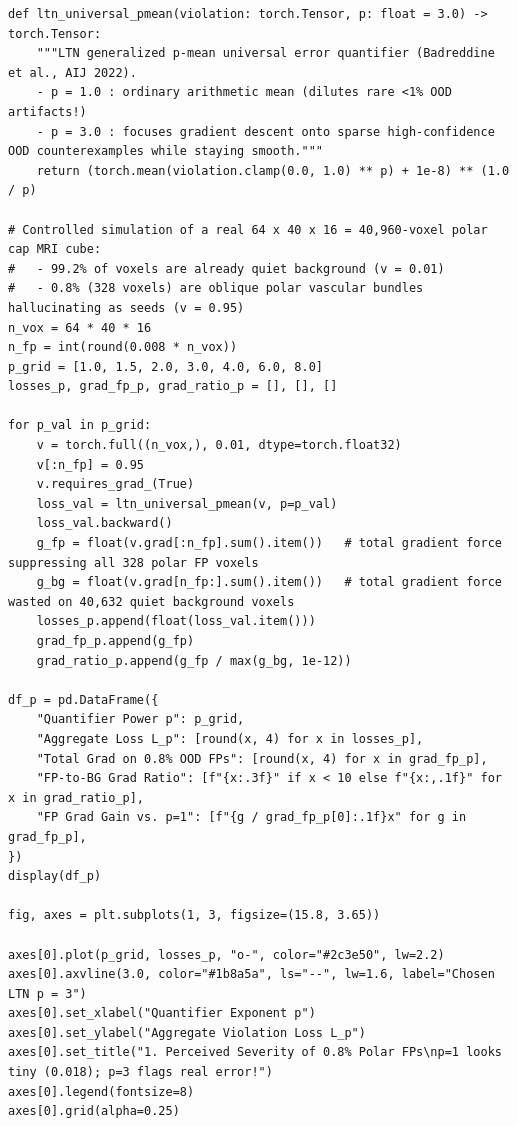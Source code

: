 \documentclass[10pt,a4paper]{article}
\begin{document}
\begin{codebox}
\begin{lstlisting}[style=pybmed]
def ltn_universal_pmean(violation: torch.Tensor, p: float = 3.0) -> torch.Tensor:
    """LTN generalized p-mean universal error quantifier (Badreddine et al., AIJ 2022).
    - p = 1.0 : ordinary arithmetic mean (dilutes rare <1% OOD artifacts!)
    - p = 3.0 : focuses gradient descent onto sparse high-confidence OOD counterexamples while staying smooth."""
    return (torch.mean(violation.clamp(0.0, 1.0) ** p) + 1e-8) ** (1.0 / p)

# Controlled simulation of a real 64 x 40 x 16 = 40,960-voxel polar cap MRI cube:
#   - 99.2% of voxels are already quiet background (v = 0.01)
#   - 0.8% (328 voxels) are oblique polar vascular bundles hallucinating as seeds (v = 0.95)
n_vox = 64 * 40 * 16
n_fp = int(round(0.008 * n_vox))
p_grid = [1.0, 1.5, 2.0, 3.0, 4.0, 6.0, 8.0]
losses_p, grad_fp_p, grad_ratio_p = [], [], []

for p_val in p_grid:
    v = torch.full((n_vox,), 0.01, dtype=torch.float32)
    v[:n_fp] = 0.95
    v.requires_grad_(True)
    loss_val = ltn_universal_pmean(v, p=p_val)
    loss_val.backward()
    g_fp = float(v.grad[:n_fp].sum().item())   # total gradient force suppressing all 328 polar FP voxels
    g_bg = float(v.grad[n_fp:].sum().item())   # total gradient force wasted on 40,632 quiet background voxels
    losses_p.append(float(loss_val.item()))
    grad_fp_p.append(g_fp)
    grad_ratio_p.append(g_fp / max(g_bg, 1e-12))

df_p = pd.DataFrame({
    "Quantifier Power p": p_grid,
    "Aggregate Loss L_p": [round(x, 4) for x in losses_p],
    "Total Grad on 0.8% OOD FPs": [round(x, 4) for x in grad_fp_p],
    "FP-to-BG Grad Ratio": [f"{x:.3f}" if x < 10 else f"{x:,.1f}" for x in grad_ratio_p],
    "FP Grad Gain vs. p=1": [f"{g / grad_fp_p[0]:.1f}x" for g in grad_fp_p],
})
display(df_p)

fig, axes = plt.subplots(1, 3, figsize=(15.8, 3.65))

axes[0].plot(p_grid, losses_p, "o-", color="#2c3e50", lw=2.2)
axes[0].axvline(3.0, color="#1b8a5a", ls="--", lw=1.6, label="Chosen LTN p = 3")
axes[0].set_xlabel("Quantifier Exponent p")
axes[0].set_ylabel("Aggregate Violation Loss L_p")
axes[0].set_title("1. Perceived Severity of 0.8% Polar FPs\np=1 looks tiny (0.018); p=3 flags real error!")
axes[0].legend(fontsize=8)
axes[0].grid(alpha=0.25)


\end{lstlisting}
\end{codebox}
\end{document}
